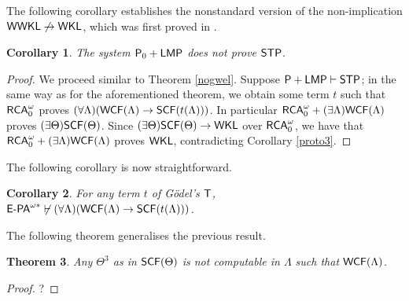 \documentclass[reqno]{amsart}
\newtheorem{thm}{Theorem}
\newtheorem{cor}[thm]{Corollary}
\def\STP{\textup{\textsf{STP}}}
\def\RCAo{\textup{\textsf{RCA}}_{0}^{\omega}}
\def\WKL{\textup{\textsf{WKL}}}
\def\WWKL{\textup{\textsf{WWKL}}}
\def\P{\textup{\textsf{P}}}
\def\di{\rightarrow}
\def\LMP{\textup{\textsf{LMP}}}
\def\SCF{\textup{\textsf{SCF}}}
\def\WCF{\textup{\textsf{WCF}}}
\numberwithin{equation}{section}
\numberwithin{thm}{section}
\begin{document}
The following corollary establishes the nonstandard version of the non-implication $\WWKL\not\di \WKL$, which was first proved in \cite{yussie}.  
 \begin{cor}
The system $\P_{0}+\LMP$ does not prove $\STP$.  
\end{cor}
\begin{proof}
We proceed similar to Theorem \ref{nogwel}.   Suppose $\P+\LMP\vdash \STP$;  in the same way as for the aforementioned theorem,
we obtain some term $t$ such that $\RCAo$ proves $(\forall \Lambda)(\WCF(\Lambda)\di \SCF(t(\Lambda)))$.  %
In particular $\RCAo+(\exists \Lambda)\WCF(\Lambda)$ proves $(\exists \Theta)\SCF(\Theta)$.
Since $(\exists \Theta)\SCF(\Theta)\di \WKL$ over $\RCAo$, we have that $\RCAo+(\exists \Lambda)\WCF(\Lambda)$ proves $\WKL$, contradicting Corollary \ref{proto3}.
\end{proof}
The following corollary is now straightforward.
 \begin{cor}
For any term $t$ of G\"odel's $\textsf{\textup{T}}$, $\textsf{\textup{E-PA}}^{\omega*}\not\vdash(\forall \Lambda)(\WCF(\Lambda)\di \SCF(t(\Lambda)))$.  
\end{cor}
The following theorem generalises the previous result.
\begin{thm}\label{import24}
Any $\Theta^{3}$ as in $\SCF(\Theta)$ is not computable in $\Lambda$ such that $\WCF(\Lambda)$.   
\end{thm}
\begin{proof}
?
\end{proof}
\end{document}
